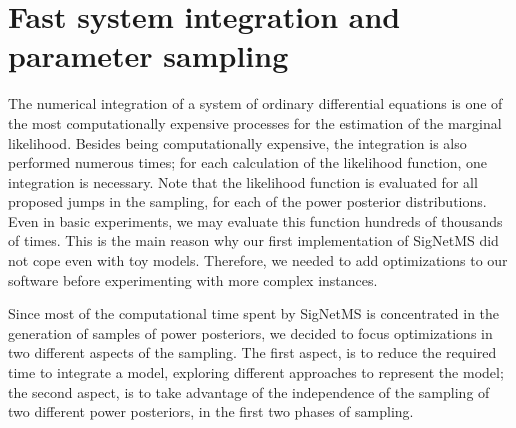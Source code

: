 \section{Fast system integration and parameter sampling}
%   
The numerical integration of a system of ordinary differential equations
is one of the most computationally expensive processes for the
estimation of the marginal likelihood. Besides being computationally
expensive, the integration is also performed numerous times; for each
calculation of the likelihood function, one integration is necessary.
Note that the likelihood function is evaluated for all proposed jumps in
the sampling, for each of the power posterior distributions. Even in
basic experiments, we may evaluate this function hundreds of thousands
of times. This is the main reason why our first implementation of 
SigNetMS did not cope even with toy models. Therefore, we needed to add
optimizations to our software before experimenting with more complex
instances.

Since most of the computational time spent by SigNetMS is concentrated
in the generation of samples of power posteriors, we decided to focus
optimizations in two different aspects of the sampling. The first
aspect, is to reduce the required time to integrate a model, exploring
different approaches to represent the model; the second aspect, is to
take advantage of the independence of the sampling of two different
power posteriors, in the first two phases of sampling.

